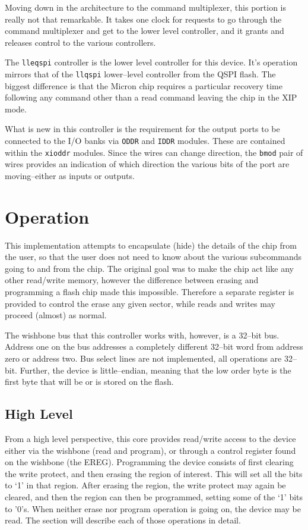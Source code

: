 \documentclass{gqtekspec}
\begin{document}
Moving down in the architecture to the command multiplexer, this portion is
really not that remarkable.  It takes one clock for requests to go through the
command multiplexer and get to the lower level controller, and it grants
and releases control to the various controllers.

The {\tt lleqspi} controller is the lower level controller for this device.
It's operation mirrors that of the {\tt llqspi} lower--level controller from
the QSPI flash.  The biggest difference is that the Micron chip requires a
particular recovery time following any command other than a read command
leaving the chip in the XIP mode.

What is new in this controller is the requirement for the output ports to
be connected to the I/O banks via {\tt ODDR} and {\tt IDDR} modules.  These
are contained within the {\tt xioddr} modules.  Since the wires can change
direction, the {\tt bmod} pair of wires provides an indication of which
direction the various bits of the port are moving--either as inputs or outputs.

\chapter{Operation}\label{chap:ops}
This implementation attempts to encapsulate (hide) the details of the chip
from the user, so that the user does not need to know about the various
subcommands going to and from the chip.  The original goal was to make the
chip act like any other read/write memory, however the difference between
erasing and programming a flash chip made this impossible.  Therefore a
separate register is provided to control the erase any given sector, while
reads and writes may proceed (almost) as normal.

The wishbone bus that this controller works with, however, is a 32--bit
bus.  Address one on the bus addresses a completely different 32--bit word
from address zero or address two.  Bus select lines are not implemented,
all operations are 32--bit.  Further, the device is little--endian, meaning
that the low order byte is the first byte that will be or is stored on the
flash.

\section{High Level}
From a high level perspective, this core provides read/write access to the
device either via the wishbone (read and program), or through a control
register found on the wishbone (the EREG).  Programming the device consists of
first clearing the write protect, and then erasing the region of interest. 
This will set all the bits to `1' in that region.  After erasing the region,
the write protect may again be cleared, and then the region can then be
programmed, setting some of the `1' bits to '0's.  When neither erase nor
program operation is going on, the device may be read.  The section will
describe each of those operations in detail.
\end{document}
